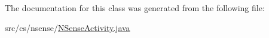 The documentation for this class was generated from the following file\-:\begin{DoxyCompactItemize}
\item 
src/cs/nsense/\hyperlink{_n_sense_activity_8java}{N\-Sense\-Activity.\-java}\end{DoxyCompactItemize}
